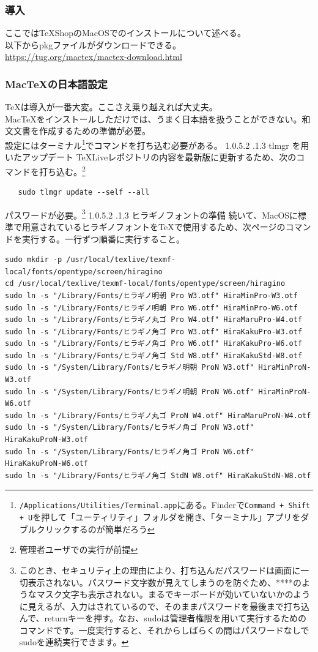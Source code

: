 \documentclass[dvipdfmx,jb5]{jarticle}
\makeatletter
\newcommand{\subsubsubsection}{\@startsection{paragraph}{4}{\z@}%
    {1.0\Cvs \@plus.5\Cdp \@minus.2\Cdp}%
    {.1\Cvs \@plus.3\Cdp}%
    {\large \bfseries}
  }
\makeatother
\begin{document}
  \subsubsection{導入}
  ここではTeXShopのMacOSでのインストールについて述べる。\\
  以下からpkgファイルがダウンロードできる。\\
  \url{https://tug.org/mactex/mactex-download.html}
  \subsubsection{Mac\TeX の日本語設定}
  \TeX は導入が一番大変。ここさえ乗り越えれば大丈夫。\\
  Mac\TeX をインストールしただけでは、うまく日本語を扱うことができない。和文文書を作成するための準備が必要。\\
  設定にはターミナル\footnote{\texttt{/Applications/Utilities/Terminal.app}にある。Finderで\texttt{Command + Shift + U}を押して「ユーティリティ」フォルダを開き、「ターミナル」アプリをダブルクリックするのが簡単だろう}でコマンドを打ち込む必要がある。
  \subsubsubsection{tlmgr を用いたアップデート}
  \TeX Liveレポジトリの内容を最新版に更新するため、次のコマンドを打ち込む。\footnote{管理者ユーザでの実行が前提}
  \begin{lstlisting}
   sudo tlmgr update --self --all
  \end{lstlisting}
  パスワードが必要。\footnote{このとき、セキュリティ上の理由により、打ち込んだパスワードは画面に一切表示されない。パスワード文字数が見えてしまうのを防ぐため、****のようなマスク文字も表示されない。まるでキーボードが効いていないかのように見えるが、入力はされているので、そのままパスワードを最後まで打ち込んで、returnキーを押す。なお、sudoは管理者権限を用いて実行するためのコマンドです。一度実行すると、それからしばらくの間はパスワードなしでsudoを連続実行できます。}
  \subsubsubsection{ヒラギノフォントの準備}
  続いて、MacOSに標準で用意されているヒラギノフォントを\TeX で使用するため、次ページのコマンドを実行する。一行ずつ順番に実行すること。
  \newpage
  \begin{lstlisting}
sudo mkdir -p /usr/local/texlive/texmf-local/fonts/opentype/screen/hiragino
cd /usr/local/texlive/texmf-local/fonts/opentype/screen/hiragino
sudo ln -s "/Library/Fonts/ヒラギノ明朝 Pro W3.otf" HiraMinPro-W3.otf
sudo ln -s "/Library/Fonts/ヒラギノ明朝 Pro W6.otf" HiraMinPro-W6.otf
sudo ln -s "/Library/Fonts/ヒラギノ丸ゴ Pro W4.otf" HiraMaruPro-W4.otf
sudo ln -s "/Library/Fonts/ヒラギノ角ゴ Pro W3.otf" HiraKakuPro-W3.otf
sudo ln -s "/Library/Fonts/ヒラギノ角ゴ Pro W6.otf" HiraKakuPro-W6.otf
sudo ln -s "/Library/Fonts/ヒラギノ角ゴ Std W8.otf" HiraKakuStd-W8.otf
sudo ln -s "/System/Library/Fonts/ヒラギノ明朝 ProN W3.otf" HiraMinProN-W3.otf
sudo ln -s "/System/Library/Fonts/ヒラギノ明朝 ProN W6.otf" HiraMinProN-W6.otf
sudo ln -s "/Library/Fonts/ヒラギノ丸ゴ ProN W4.otf" HiraMaruProN-W4.otf
sudo ln -s "/System/Library/Fonts/ヒラギノ角ゴ ProN W3.otf" HiraKakuProN-W3.otf
sudo ln -s "/System/Library/Fonts/ヒラギノ角ゴ ProN W6.otf" HiraKakuProN-W6.otf
sudo ln -s "/Library/Fonts/ヒラギノ角ゴ StdN W8.otf" HiraKakuStdN-W8.otf
\end{lstlisting}
\end{document}

